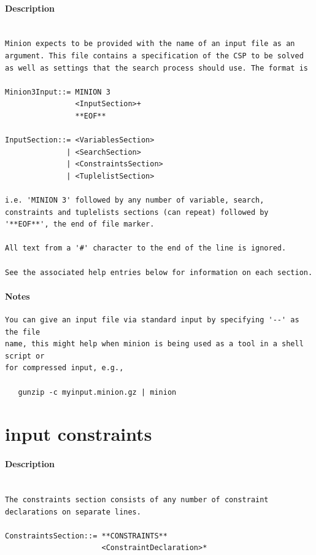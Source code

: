 \documentclass[oneside]{book}
\begin{document}
\paragraph{Description}
{\footnotesize
\begin{verbatim}

Minion expects to be provided with the name of an input file as an
argument. This file contains a specification of the CSP to be solved
as well as settings that the search process should use. The format is

Minion3Input::= MINION 3
                <InputSection>+
                **EOF**

InputSection::= <VariablesSection> 
              | <SearchSection>
              | <ConstraintsSection> 
              | <TuplelistSection>

i.e. 'MINION 3' followed by any number of variable, search,
constraints and tuplelists sections (can repeat) followed by
'**EOF**', the end of file marker.

All text from a '#' character to the end of the line is ignored.

See the associated help entries below for information on each section.
\end{verbatim}
}
\paragraph{Notes}
{\footnotesize
\begin{verbatim}
You can give an input file via standard input by specifying '--' as the file
name, this might help when minion is being used as a tool in a shell script or
for compressed input, e.g.,

   gunzip -c myinput.minion.gz | minion
\end{verbatim}
}
\section{input constraints}
\paragraph{Description}
{\footnotesize
\begin{verbatim}

The constraints section consists of any number of constraint
declarations on separate lines.

ConstraintsSection::= **CONSTRAINTS**
                      <ConstraintDeclaration>*
\end{verbatim}
}
\end{document}

